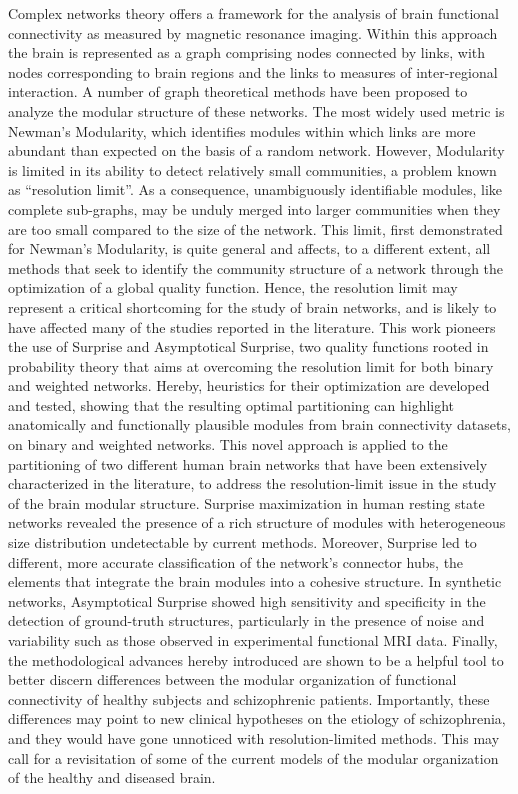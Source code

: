 Complex networks theory offers a framework for the analysis of brain functional connectivity as measured by magnetic resonance imaging.
Within this approach the brain is represented as a graph comprising nodes connected by links, with nodes corresponding to brain regions and the links to measures of inter-regional interaction.
A number of graph theoretical methods have been proposed to analyze the modular structure of these networks.
The most widely used metric is Newman's Modularity, which identifies modules within which links are more abundant than expected on the basis of a random network. However, Modularity is limited in its ability to detect relatively small communities, a problem known as ``resolution limit''.
As a consequence, unambiguously identifiable modules, like complete sub-graphs, may be unduly merged into larger communities when they are too small compared to the size of the network.
This limit, first demonstrated for Newman's Modularity, is quite general and affects, to a different extent, all methods that seek to identify the community structure of a network through the optimization of a global quality function.
Hence, the resolution limit may represent a critical shortcoming for the study of brain networks, and is likely to have affected many of the studies reported in the literature.
This work pioneers the use of Surprise and Asymptotical Surprise, two quality functions rooted in probability theory that aims at overcoming the resolution limit for both binary and weighted networks.
Hereby, heuristics for their optimization are developed and tested, showing that the resulting optimal partitioning can highlight anatomically and functionally plausible modules from brain connectivity datasets, on binary and weighted networks.
This novel approach is applied to the partitioning of two different human brain networks that have been extensively characterized in the literature, to address the resolution-limit issue in the study of the brain modular structure.
Surprise maximization in human resting state networks revealed the presence of a rich structure of modules with heterogeneous size distribution undetectable by current methods.
Moreover, Surprise led to different, more accurate classification of the network's connector hubs, the elements that integrate the brain modules into a cohesive structure.
In synthetic networks, Asymptotical Surprise showed high sensitivity and specificity in the detection of ground-truth structures, particularly in the presence of noise and variability such as those observed in experimental functional MRI data.
Finally, the methodological advances hereby introduced are shown to be a helpful tool to better discern differences between the modular organization of functional connectivity of healthy subjects and schizophrenic patients.
Importantly, these differences may point to new clinical hypotheses on the etiology of schizophrenia, and they would have gone unnoticed with resolution-limited methods.
This may call for a revisitation of some of the current models of the modular organization of the healthy and diseased brain.
